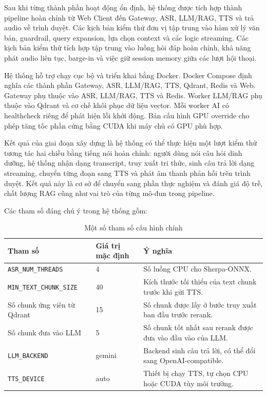 \documentclass[a4paper,13pt,oneside]{report}
\begin{document}
Sau khi từng thành phần hoạt động ổn định, hệ thống được tích hợp thành pipeline hoàn chỉnh từ Web Client đến Gateway, ASR, LLM/RAG, TTS và trả audio về trình duyệt. Các kịch bản kiểm thử đơn vị tập trung vào hàm xử lý văn bản, guardrail, query expansion, lựa chọn context và các logic streaming. Các kịch bản kiểm thử tích hợp tập trung vào luồng hỏi đáp hoàn chỉnh, khả năng phát audio liên tục, barge-in và việc giữ session memory giữa các lượt hội thoại.

Hệ thống hỗ trợ chạy cục bộ và triển khai bằng Docker. Docker Compose định nghĩa các thành phần Gateway, ASR, LLM/RAG, TTS, Qdrant, Redis và Web. Gateway phụ thuộc vào ASR, LLM/RAG, TTS và Redis. Worker LLM/RAG phụ thuộc vào Qdrant và cơ chế khôi phục dữ liệu vector. Mỗi worker AI có healthcheck riêng để phát hiện lỗi khởi động. Bản cấu hình GPU override cho phép tăng tốc phần cứng bằng CUDA khi máy chủ có GPU phù hợp.

Kết quả của giai đoạn xây dựng là hệ thống có thể thực hiện một lượt kiểm thử tương tác hai chiều bằng tiếng nói hoàn chỉnh: người dùng nói câu hỏi dinh dưỡng, hệ thống nhận dạng transcript, truy xuất tri thức, sinh câu trả lời dạng streaming, chuyển từng đoạn sang TTS và phát âm thanh phản hồi trên trình duyệt. Kết quả này là cơ sở để chuyển sang phần thực nghiệm và đánh giá độ trễ, chất lượng RAG cũng như vai trò của từng mô-đun trong pipeline.

Các tham số đáng chú ý trong hệ thống gồm:

\begin{table}[H]
    \centering
    \caption{Một số tham số cấu hình chính}
    \begin{tabular}{|p{4cm}|p{3cm}|p{6cm}|}
        \hline
        \textbf{Tham số}                & \textbf{Giá trị mặc định} & \textbf{Ý nghĩa}                                             \\
        \hline
        \texttt{ASR\_NUM\_THREADS}      & 4                         & Số luồng CPU cho Sherpa-ONNX.                                \\
        \hline
        \texttt{MIN\_TEXT\_CHUNK\_SIZE} & 40                        & Kích thước tối thiểu của text chunk trước khi gửi TTS.       \\
        \hline
        Số chunk ứng viên từ Qdrant     & 15                        & Số chunk được lấy ở bước truy xuất ban đầu trước rerank.     \\
        \hline
        Số chunk đưa vào LLM            & 5                         & Số chunk tốt nhất sau rerank được đưa vào đầu vào của LLM.   \\
        \hline
        \texttt{LLM\_BACKEND}           & gemini                    & Backend sinh câu trả lời, có thể đổi sang OpenAI-compatible. \\
        \hline
        \texttt{TTS\_DEVICE}            & auto                      & Thiết bị chạy TTS, tự chọn CPU hoặc CUDA tùy môi trường.     \\
        \hline
    \end{tabular}
\end{table}
\end{document}

